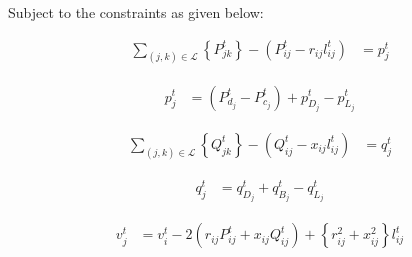 \documentclass[../../outputs/main.tex]{subfiles}
\begin{document}
Subject to the constraints  as given below:


\begin{align}
    {\sum_{(j, k) \in \mathcal{L}} \left\{P_{jk}^t\right\} 
    - \left(P_{ij}^t - r_{ij}l_{ij}^t\right)} &= p_j^t
    \label{eq:RealPowerBalanceNodej}
\end{align}

\vspace{-1.5em} %

\begin{align}
    p_j^t &= \left(P_{d_j}^t - P_{c_j}^t\right) + p^t_{D_j} - p^t_{L_j} \label{eq:RealPowerBalanceNodej_pj}
\end{align}

\vspace{-2.0em} %


\begin{align}
    {\sum_{(j, k) \in \mathcal{L}} \left\{Q_{jk}^t\right\}  
    - \left(Q_{ij}^t - x_{ij}l_{ij}^t\right)} &= q_j^t
    \label{eq:ReactivePowerBalanceNodej} 
\end{align}

\vspace{-1.5em} %

\begin{align}
    q_j^t &= q_{D_j}^t + q_{B_j}^t - q^t_{L_j} \label{eq:ReactivePowerBalanceNodej_qj}
\end{align}

\vspace{-1.5em} %

\begin{align}
    {v_j^t} &= {v_{i}^t - 2(r_{ij}P_{ij}^t + x_{ij}Q_{ij}^t) + \left\{r_{ij}^2 + x_{ij}^2\right\}l_{ij}^t}  
    \label{eq:KVL-branch-ij}
\end{align}
\end{document}
